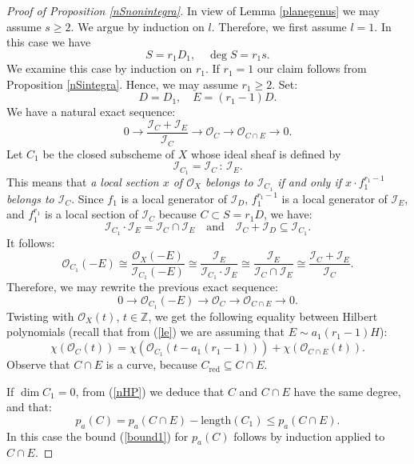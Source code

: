 \documentclass[9pt,a4paper]{amsart}
\theoremstyle{plain}
\theoremstyle{definition}
\theoremstyle{remark}
\begin{document}
\smallskip
\begin{proof}[Proof of Proposition \ref{nSnonintegra}]
In view of Lemma \ref{planegenus} we may assume $s\geq 2$. We argue
by induction on $l$. Therefore, we first assume $l=1$. In this case
we have
$$
S=r_1D_1,\quad \deg S=r_1s.
$$
We examine this case  by induction on $r_1$. If $r_1=1$ our claim
follows from Proposition \ref{nSintegra}. Hence, we may assume
$r_1\geq 2$. Set:
$$
D=D_1,\quad E=(r_1-1)D.
$$
We have a natural exact sequence:
$$
0\to \frac{\mathcal I_C+\mathcal I_E}{\mathcal I_C}\to \mathcal
O_C\to \mathcal O_{C\cap E}\to 0.
$$
Let $C_1$ be the closed subscheme of $X$ whose ideal sheaf is
defined by
$$
\mathcal I_{C_1}=\mathcal I_{C}\, :\, \mathcal I_{E}.
$$
This means that {\it a local section $x$ of $\mathcal O_X$ belongs
to $\mathcal I_{C_1}$ if and only if $x\cdot f_1^{r_1-1}$ belongs to
$\mathcal I_{C}$}. Since  $f_1$ is a local generator of $\mathcal
I_D$,  $f_1^{r_1-1}$ is a local generator of $\mathcal I_E$, and $f_1^{r_1}$
is a local section of $\mathcal I_C$ because $C\subset S=r_1D$, we
have:
\begin{equation}\label{CDE}
\mathcal I_{C_1}\cdot\mathcal I_E={\mathcal I_{C}\cap\mathcal
I_E}\quad {\text{and}}\quad \mathcal I_{C}+\mathcal I_D\subseteq
{\mathcal I_{C_1}}.
\end{equation}
It follows:
$$
\mathcal O_{C_1}(-E)\cong \frac{\mathcal O_X(-E)}{\mathcal
I_{C_1}(-E)}\cong \frac{\mathcal I_E}{\mathcal I_{C_1}\cdot\mathcal
I_E}\cong \frac{\mathcal I_E}{\mathcal I_{C}\cap\mathcal I_E}\cong
\frac{\mathcal I_C+\mathcal I_E}{\mathcal I_C}.
$$
Therefore, we may rewrite the previous exact sequence:
\begin{equation}\label{bnHP}
0\to \mathcal O_{C_1}(-E)\to \mathcal O_C\to \mathcal O_{C\cap E}\to
0.
\end{equation}
Twisting with $\mathcal O_X(t)$, $t\in\mathbb Z$, we get the
following equality between Hilbert polynomials (recall that from (\ref{le}) we
are assuming that $E\sim a_1(r_1-1)H$):
\begin{equation}\label{nHP}
\chi \left(\mathcal O_{C}(t)\right)=\chi \left(\mathcal
O_{C_1}(t-a_1(r_1-1))\right)+\chi \left(\mathcal O_{C\cap E}(t)\right).
\end{equation}
Observe that $C\cap E$ is a curve, because
$C_{{\text{red}}}\subseteq C\cap E$.

If $\dim C_1=0$, from (\ref{nHP}) we deduce that $C$ and $C\cap E$
have the same degree, and that:
\begin{equation}\label{nnHP}
p_a(C)=p_a(C\cap E)-{\text{length}}(C_1)\leq p_a(C\cap E).
\end{equation}
In this case the bound (\ref{bound1}) for $p_a(C)$ follows by
induction applied to $C\cap E$.


\end{proof}
\end{document}
